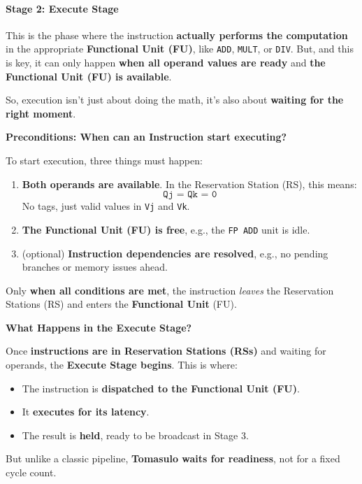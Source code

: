 \paragraph{Stage 2: Execute Stage}

This is the phase where the instruction \textbf{actually performs the computation} in the appropriate \textbf{Functional Unit (FU)}, like \texttt{ADD}, \texttt{MULT}, or \texttt{DIV}. But, and this is key, it can only happen \textbf{when all operand values are ready} and \textbf{the Functional Unit (FU) is available}.

\highspace
So, execution isn't just about doing the math, it's also about \textbf{waiting for the right moment}.

\highspace
\begin{flushleft}
    \textcolor{Green3}{ \textbf{Preconditions: When can an Instruction start executing?}}
\end{flushleft}
To start execution, three things must happen:
\begin{enumerate}
    \item \textbf{Both operands are available}. In the Reservation Station (RS), this means:
    \begin{equation*}
        \texttt{Qj = Qk = 0}
    \end{equation*}
    No tags, just valid values in \texttt{Vj} and \texttt{Vk}.

    \item \textbf{The Functional Unit (FU) is free}, e.g., the \texttt{FP ADD} unit is idle.
    
    \item (optional) \textbf{Instruction dependencies are resolved}, e.g., no pending branches or memory issues ahead.
\end{enumerate}
Only \textbf{when all conditions are met}, the instruction \emph{leaves} the Reservation Stations (RS) and enters the \textbf{Functional Unit} (FU).

\highspace
\begin{flushleft}
    \textcolor{Green3}{ \textbf{What Happens in the Execute Stage?}}
\end{flushleft}
Once \textbf{instructions are in Reservation Stations (RSs)} and waiting for operands, the \textbf{Execute Stage begins}. This is where:
\begin{itemize}
    \item The instruction is \textbf{dispatched to the Functional Unit (FU)}.
    \item It \textbf{executes for its latency}.
    \item The result is \textbf{held}, ready to be broadcast in Stage 3.
\end{itemize}
But unlike a classic pipeline, \textbf{Tomasulo waits for readiness}, not for a fixed cycle count.

